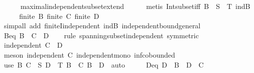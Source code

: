 \begin{isabellebody}
\ \ \ \ \isamarkupfalse%
\ maximal{\isacharunderscore}{\kern0pt}independent{\isacharunderscore}{\kern0pt}subset{\isacharunderscore}{\kern0pt}extend\isanewline
\ \ \ \ \isamarkupfalse%
\ {\isacharparenleft}{\kern0pt}metis\ Int{\isacharunderscore}{\kern0pt}subset{\isacharunderscore}{\kern0pt}iff\ {\isacartoucheopen}B\ {\isasymsubseteq}\ S\ {\isasyminter}\ T{\isacartoucheclose}\ indB{\isacharparenright}{\kern0pt}\isanewline
\ \ \isamarkupfalse%
\ \isamarkupfalse%
\ {\isachardoublequoteopen}finite\ B{\isachardoublequoteclose}\ {\isachardoublequoteopen}finite\ C{\isachardoublequoteclose}\ {\isachardoublequoteopen}finite\ D{\isachardoublequoteclose}\isanewline
\ \ \ \ \isamarkupfalse%
\ {\isacharparenleft}{\kern0pt}simp{\isacharunderscore}{\kern0pt}all\ add{\isacharcolon}{\kern0pt}\ finiteI{\isacharunderscore}{\kern0pt}independent\ indB\ independent{\isacharunderscore}{\kern0pt}bound{\isacharunderscore}{\kern0pt}general{\isacharparenright}{\kern0pt}\isanewline
\ \ \isamarkupfalse%
\ Beq{\isacharcolon}{\kern0pt}\ {\isachardoublequoteopen}B\ {\isacharequal}{\kern0pt}\ C\ {\isasyminter}\ D{\isachardoublequoteclose}\isanewline
\ \ \isamarkupfalse%
\ {\isacharparenleft}{\kern0pt}rule\ spanning{\isacharunderscore}{\kern0pt}subset{\isacharunderscore}{\kern0pt}independent\ {\isacharbrackleft}{\kern0pt}symmetric{\isacharbrackright}{\kern0pt}{\isacharparenright}{\kern0pt}\isanewline
\ \ \ \ \isamarkupfalse%
\ {\isachardoublequoteopen}independent\ {\isacharparenleft}{\kern0pt}C\ {\isasyminter}\ D{\isacharparenright}{\kern0pt}{\isachardoublequoteclose}\isanewline
\ \ \ \ \ \ \isamarkupfalse%
\ {\isacharparenleft}{\kern0pt}meson\ {\isacartoucheopen}independent\ C{\isacartoucheclose}\ independent{\isacharunderscore}{\kern0pt}mono\ inf{\isachardot}{\kern0pt}cobounded{}{\isacharparenright}{\kern0pt}\isanewline
\ \ \isamarkupfalse%
\ {\isacharparenleft}{\kern0pt}use\ B\ {\isacartoucheopen}C\ {\isasymsubseteq}\ S{\isacartoucheclose}\ {\isacartoucheopen}D\ {\isasymsubseteq}\ T{\isacartoucheclose}\ {\isacartoucheopen}B\ {\isasymsubseteq}\ C{\isacartoucheclose}\ {\isacartoucheopen}B\ {\isasymsubseteq}\ D{\isacartoucheclose}\ \ auto{\isacharparenright}{\kern0pt}\isanewline
\ \ \isamarkupfalse%
\ \isamarkupfalse%
\ Deq{\isacharcolon}{\kern0pt}\ {\isachardoublequoteopen}D\ {\isacharequal}{\kern0pt}\ B\ {\isasymunion}\ {\isacharparenleft}{\kern0pt}D\ {\isacharminus}{\kern0pt}\ C{\isacharparenright}{\kern0pt}{\isachardoublequoteclose}\isanewline

\end{isabellebody}
